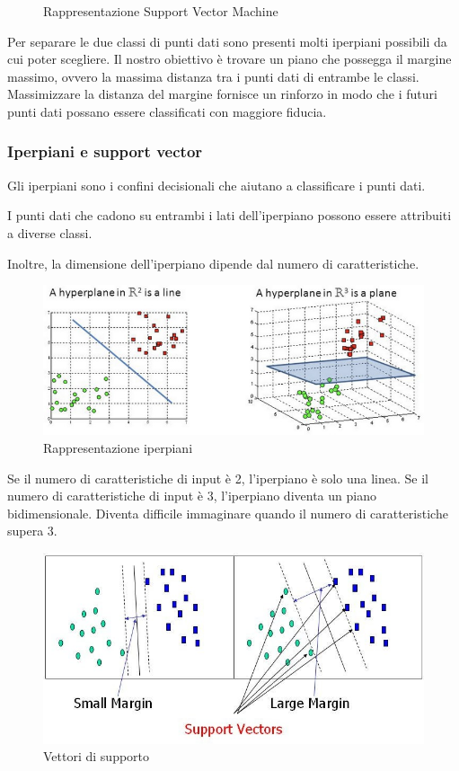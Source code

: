 \begin{figure}[h]
\begin{minipage}[b]{0.45\linewidth}
  \end{minipage}
  \caption{Rappresentazione Support Vector Machine}
\end{figure}

Per separare le due classi di punti dati sono presenti molti iperpiani possibili da cui poter scegliere. Il nostro obiettivo è trovare un piano che possegga il margine massimo, ovvero la massima distanza tra i punti dati di entrambe le classi. Massimizzare la distanza del margine fornisce un rinforzo in modo che i futuri punti dati possano essere classificati con maggiore fiducia.

\subsubsection{Iperpiani e support vector}
Gli iperpiani sono i confini decisionali che aiutano a classificare i punti dati. 

I punti dati che cadono su entrambi i lati dell'iperpiano possono essere attribuiti a diverse classi. 

Inoltre, la dimensione dell’iperpiano  dipende dal numero di caratteristiche. 

\begin{figure}
    \begin{center}    
        \includegraphics[width=0.9\linewidth]{images/image27.jpeg}
        \caption{Rappresentazione iperpiani}
    \end{center}
\end{figure}

\newpage
Se il numero di caratteristiche di input è 2, l'iperpiano è solo una linea. Se il numero di caratteristiche di input è 3, l'iperpiano diventa un piano bidimensionale. Diventa difficile immaginare quando il numero di caratteristiche supera 3.
\begin{figure}
    \begin{center}    
        \includegraphics[width=0.9\linewidth]{images/image28.jpeg}
        \caption{Vettori di supporto}
    \end{center}
\end{figure}

